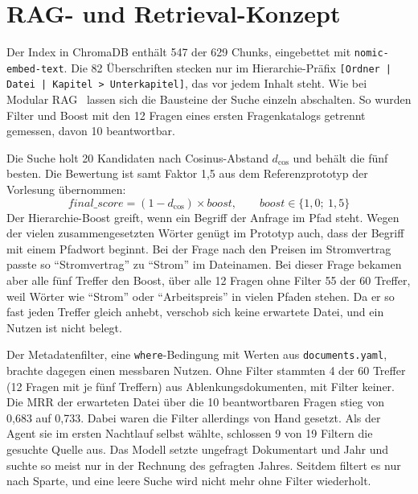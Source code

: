 
\chapter{RAG- und Retrieval-Konzept}
\label{chap:04-retrieval}


Der Index in ChromaDB enthält 547 der 629 Chunks, eingebettet mit \texttt{nomic-embed-text}. Die 82 Überschriften stecken nur im Hierarchie-Präfix \texttt{[Ordner | Datei | Kapitel > Unterkapitel]}, das vor jedem Inhalt steht. Wie bei Modular RAG~\cite{gao2023survey} lassen sich die Bausteine der Suche einzeln abschalten. So wurden Filter und Boost mit den 12 Fragen eines ersten Fragenkatalogs getrennt gemessen, davon 10 beantwortbar.

Die Suche holt 20 Kandidaten nach Cosinus-Abstand $d_{\cos}$ und behält die fünf besten. Die Bewertung ist samt Faktor 1,5 aus dem Referenzprototyp der Vorlesung übernommen:
\[
\mathit{final\_score} = (1 - d_{\cos}) \times \mathit{boost}, \qquad \mathit{boost} \in \{1{,}0;\ 1{,}5\}
\]
Der Hierarchie-Boost greift, wenn ein Begriff der Anfrage im Pfad steht. Wegen der vielen zusammengesetzten Wörter genügt im Prototyp auch, dass der Begriff mit einem Pfadwort beginnt. Bei der Frage nach den Preisen im Stromvertrag passte so \enquote{Stromvertrag} zu \enquote{Strom} im Dateinamen. Bei dieser Frage bekamen aber alle fünf Treffer den Boost, über alle 12 Fragen ohne Filter 55 der 60 Treffer, weil Wörter wie \enquote{Strom} oder \enquote{Arbeitspreis} in vielen Pfaden stehen. Da er so fast jeden Treffer gleich anhebt, verschob sich keine erwartete Datei, und ein Nutzen ist nicht belegt.

Der Metadatenfilter, eine \texttt{where}-Bedingung mit Werten aus \texttt{documents.yaml}, brachte dagegen einen messbaren Nutzen. Ohne Filter stammten 4 der 60 Treffer (12 Fragen mit je fünf Treffern) aus Ablenkungsdokumenten, mit Filter keiner. Die MRR der erwarteten Datei über die 10 beantwortbaren Fragen stieg von 0,683 auf 0,733. Dabei waren die Filter allerdings von Hand gesetzt. Als der Agent sie im ersten Nachtlauf selbst wählte, schlossen 9 von 19 Filtern die gesuchte Quelle aus. Das Modell setzte ungefragt Dokumentart und Jahr und suchte so meist nur in der Rechnung des gefragten Jahres. Seitdem filtert es nur nach Sparte, und eine leere Suche wird nicht mehr ohne Filter wiederholt.

